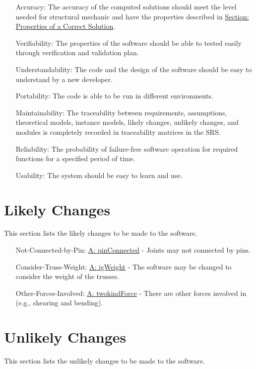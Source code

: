 \documentclass[12pt]{article}
\begin{document}
\begin{itemize}
\item[Accuracy:\phantomsection\label{accurate}]{The accuracy of the computed solutions should meet the level needed for structural mechanic and have the properties described in \hyperref[Sec:CorSolProps]{Section: Properties of a Correct Solution}.}
\item[Verifiability:\phantomsection\label{verifiable}]{The properties of the software should be able to tested easily through verification and validation plan.}
\item[Understandability:\phantomsection\label{understandable}]{The code and the design of the software should be easy to understand  by a new developer.}
\item[Portability:\phantomsection\label{portable}]{The code is able to be run in different environments.}
\item[Maintainability:\phantomsection\label{maintainable}]{The traceability between requirements, assumptions, theoretical models, instance models, likely changes, unlikely changes, and modules is completely recorded in traceability matrices in the SRS.}
\item[Reliability:\phantomsection\label{reliable}]{The probability of failure-free software operation for required functions for a specified period of time.}
\item[Usability:\phantomsection\label{usable}]{The system should be easy to learn and use.}
\end{itemize}
\section{Likely Changes}
\label{Sec:LCs}
This section lists the likely changes to be made to the software.

\begin{itemize}
\item[Not-Connected-by-Pin:\phantomsection\label{likeChgNCbP}]{\hyperref[pinConnected]{A: pinConnected} -  Joints may not connected by pins.}
\item[Consider-Truss-Weight:\phantomsection\label{likeChgWoT}]{\hyperref[igWeight]{A: igWeight} -  The software may be changed to consider the weight of the trusses.}
\item[Other-Forces-Involved:\phantomsection\label{likeChgOtherF}]{\hyperref[twokindForce]{A: twokindForce} -  There are other forces involved in (e.g., shearing and bending).}
\end{itemize}
\section{Unlikely Changes}
\label{Sec:UCs}
This section lists the unlikely changes to be made to the software.
\end{document}

